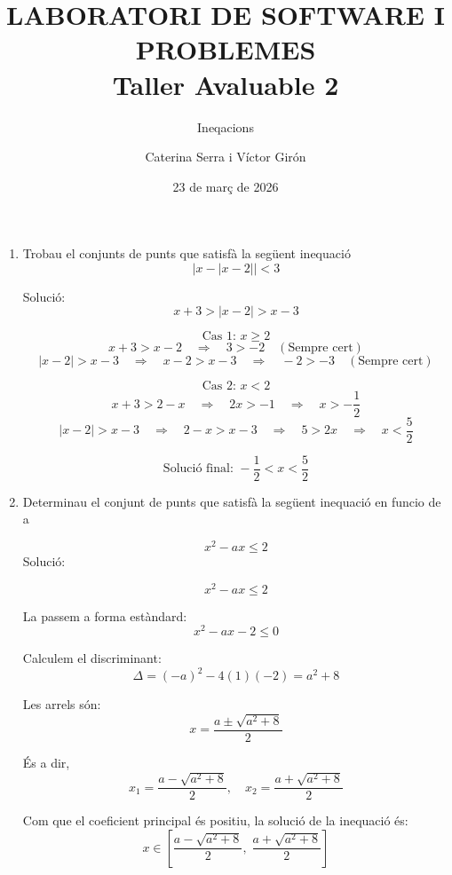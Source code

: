 \documentclass{article}
\begin{document}
\title{LABORATORI DE SOFTWARE I PROBLEMES \\ Taller Avaluable 2}
\author{Caterina Serra i Víctor Girón}
\date{23 de març de 2026}
\maketitle
\subtitle{Ineqacions}
\begin{enumerate}
\item Trobau el conjunts de punts que satisfà la següent inequació
    \begin{equation}
        |x - |x - 2|| < 3
    \end{equation}

    Solució: 
    \[
x + 3 > |x - 2| > x - 3
\]

\[
\text{Cas 1: } x \ge 2
\]
\[
x + 3 > x - 2 \quad \Rightarrow \quad 3 > -2 \quad (\text{Sempre cert})
\]
\[
|x - 2| > x - 3 \quad \Rightarrow \quad x - 2 > x - 3 \quad \Rightarrow \quad -2 > -3 \quad (\text{Sempre cert})
\]

\[
\text{Cas 2: } x < 2
\]
\[
x + 3 > 2 - x \quad \Rightarrow \quad 2x > -1 \quad \Rightarrow \quad x > -\frac{1}{2}
\]
\[
|x - 2| > x - 3 \quad \Rightarrow \quad 2 - x > x - 3 \quad \Rightarrow \quad 5 > 2x \quad \Rightarrow \quad x < \frac{5}{2}
\]

\[
\text{Solució final: } -\frac{1}{2} < x < \frac{5}{2}
\]
\item Determinau el conjunt de punts que satisfà la següent inequació en funcio de a \in{}
    
    \begin{equation}
        x^2 - ax \le 2
    \end{equation}
    Solució:
    
\[
x^2 - ax \le 2
\]

La passem a forma estàndard:
\[
x^2 - ax - 2 \le 0
\]

Calculem el discriminant:
\[
\Delta = (-a)^2 - 4(1)(-2) = a^2 + 8
\]

Les arrels són:
\[
x = \frac{a \pm \sqrt{a^2 + 8}}{2}
\]

És a dir,
\[
x_1 = \frac{a - \sqrt{a^2 + 8}}{2}, \quad
x_2 = \frac{a + \sqrt{a^2 + 8}}{2}
\]

Com que el coeficient principal és positiu, la solució de la inequació és:
\[
x \in \left[ \frac{a - \sqrt{a^2 + 8}}{2}, \; \frac{a + \sqrt{a^2 + 8}}{2} \right]
\]
        
\end{enumerate}
\end{document}
